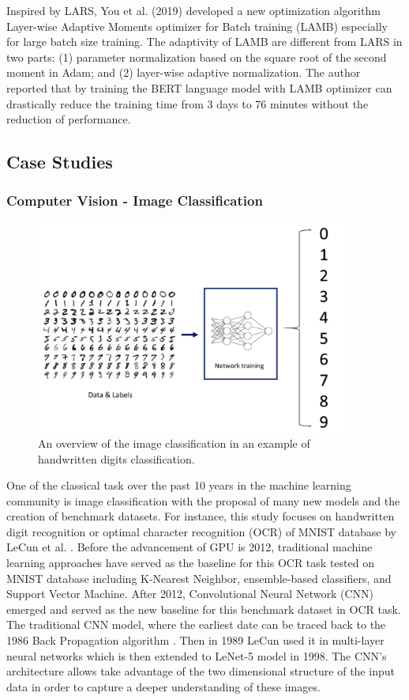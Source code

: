 Inspired by LARS, You et al. (2019) developed a new optimization algorithm Layer-wise Adaptive Moments optimizer for Batch training (LAMB) especially for large batch size training. The adaptivity of LAMB are different from LARS in two parts: (1) parameter normalization based on the square root of the second moment in Adam; and (2) layer-wise adaptive normalization. The author reported that by training the BERT language model with LAMB optimizer can drastically reduce the training time from 3 days to 76 minutes without the reduction of performance.

\subsection{Case Studies}


\subsubsection{Computer Vision - Image Classification}

\begin{figure}[!t]
    \centering
    \includegraphics[width=\linewidth, height=7cm]{img/mnist.png}
    \caption{An overview of the image classification in an example of handwritten digits classification.}
    \label{fig:DrQA_overview}
    \vspace{-10pt}
\end{figure}

One of the classical task over the past 10 years in the machine learning community is image classification with the proposal of many new models and the creation of benchmark datasets. For instance, this study focuses on handwritten digit recognition or optimal character recognition (OCR) of MNIST database by LeCun et al. \cite{LeCun}. Before the advancement of GPU is 2012, traditional machine learning approaches have served as the baseline for this OCR task tested on MNIST database including K-Nearest Neighbor, ensemble-based classifiers, and Support Vector Machine. After 2012, Convolutional Neural Network (CNN) emerged and served as the new baseline for this benchmark dataset in OCR task.
The traditional CNN model, where the earliest date can be traced back
to the 1986 Back Propagation algorithm \cite{BP}. Then in 1989 LeCun used it
in multi-layer neural networks \cite{1989Lecun} which is then extended to LeNet-5 model in 1998. The CNN's architecture allows take advantage of the
two dimensional structure of the input data in order to capture a deeper understanding of these images.



